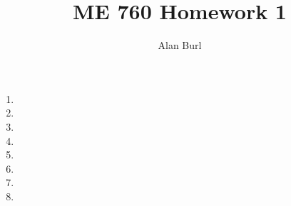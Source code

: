 \documentclass[12pt]{article}
\author{Alan Burl}
\title{ME 760 Homework 1}
\begin{document}
\maketitle
\clearpage
\begin{enumerate}
	\item \clearpage %
	\item \clearpage %
	\item \clearpage %
	\item \clearpage %
	\item \clearpage %
	\item \clearpage %
	\item \clearpage %
	\item \clearpage 
\end{enumerate}
\clearpage
\end{document}
